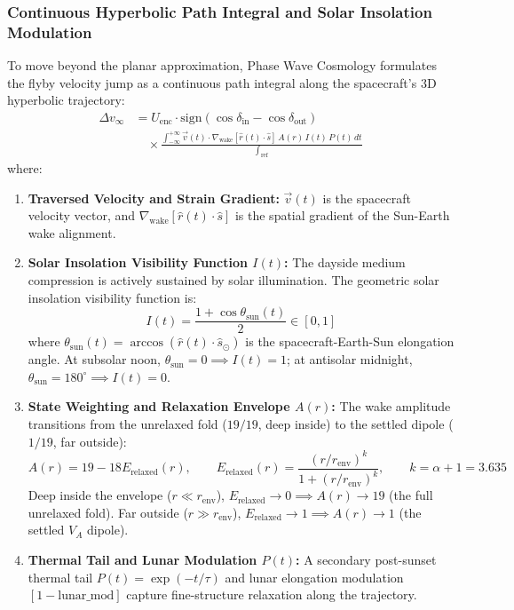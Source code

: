 \documentclass[11pt,a4paper]{article}
\begin{document}
\subsubsection{Continuous Hyperbolic Path Integral and Solar Insolation Modulation}
\label{subsubsec:continuous_path_integral}

To move beyond the planar approximation, Phase Wave Cosmology formulates the flyby velocity jump as a continuous path integral along the spacecraft's 3D hyperbolic trajectory:
\begin{equation}
\begin{aligned} \Delta v_\infty &= U_{\text{enc}} \cdot \text{sign}(\cos\delta_{\text{in}} - \cos\delta_{\text{out}}) \\ &\quad \times \frac{\int_{-\infty}^{+\infty} \vec{v}(t) \cdot \nabla_{\text{wake}}[\hat{r}(t)\cdot\hat{s}] \, A(r) \, I(t) \, P(t) \, dt}{\int_{\text{ref}}} \end{aligned}
\label{eq:flyby_continuous_integral}
\end{equation}
where:
\begin{enumerate}
    \item \textbf{Traversed Velocity and Strain Gradient:} $\vec{v}(t)$ is the spacecraft velocity vector, and $\nabla_{\text{wake}}[\hat{r}(t)\cdot\hat{s}]$ is the spatial gradient of the Sun-Earth wake alignment.
    \item \textbf{Solar Insolation Visibility Function $I(t)$:} The dayside medium compression is actively sustained by solar illumination. The geometric solar insolation visibility function is:
    \begin{equation}
    I(t) = \frac{1 + \cos\theta_{\text{sun}}(t)}{2} \in [0, 1]
    \label{eq:insolation_function}
    \end{equation}
    where $\theta_{\text{sun}}(t) = \arccos(\hat{r}(t)\cdot\hat{s}_\odot)$ is the spacecraft-Earth-Sun elongation angle. At subsolar noon, $\theta_{\text{sun}} = 0 \implies I(t) = 1$; at antisolar midnight, $\theta_{\text{sun}} = 180^\circ \implies I(t) = 0$.
    \item \textbf{State Weighting and Relaxation Envelope $A(r)$:} The wake amplitude transitions from the unrelaxed fold ($19/19$, deep inside) to the settled dipole ($1/19$, far outside):
    \begin{equation}
    A(r) = 19 - 18 E_{\text{relaxed}}(r), \qquad E_{\text{relaxed}}(r) = \frac{(r/r_{\text{env}})^k}{1 + (r/r_{\text{env}})^k}, \qquad k = \alpha + 1 = 3.635
    \label{eq:relaxation_envelope_a}
    \end{equation}
    Deep inside the envelope ($r \ll r_{\text{env}}$), $E_{\text{relaxed}} \to 0 \implies A(r) \to 19$ (the full unrelaxed fold). Far outside ($r \gg r_{\text{env}}$), $E_{\text{relaxed}} \to 1 \implies A(r) \to 1$ (the settled $V_A$ dipole).
    \item \textbf{Thermal Tail and Lunar Modulation $P(t)$:} A secondary post-sunset thermal tail $P(t) = \exp(-t/\tau)$ and lunar elongation modulation $[1 - \text{lunar\_mod}]$ capture fine-structure relaxation along the trajectory.
\end{enumerate}
\end{document}
